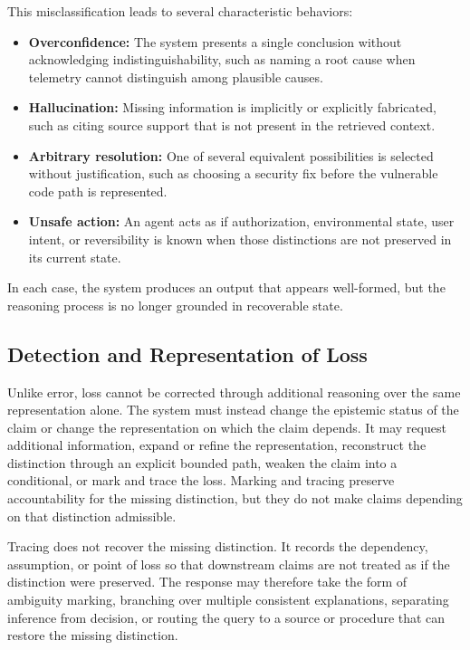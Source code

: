 \documentclass[11pt]{article}
\begin{document}
This misclassification leads to several characteristic behaviors:
\begin{itemize}[leftmargin=1.5em]
    \item \textbf{Overconfidence:} The system presents a single conclusion without acknowledging indistinguishability, such as naming a root cause when telemetry cannot distinguish among plausible causes.
    \item \textbf{Hallucination:} Missing information is implicitly or explicitly fabricated, such as citing source support that is not present in the retrieved context.
    \item \textbf{Arbitrary resolution:} One of several equivalent possibilities is selected without justification, such as choosing a security fix before the vulnerable code path is represented.
    \item \textbf{Unsafe action:} An agent acts as if authorization, environmental state, user intent, or reversibility is known when those distinctions are not preserved in its current state.
\end{itemize}

In each case, the system produces an output that appears well-formed, but the reasoning process is no longer grounded in recoverable state.

\subsection{Detection and Representation of Loss}

Unlike error, loss cannot be corrected through additional reasoning over the same representation alone. The system must instead change the epistemic status of the claim or change the representation on which the claim depends. It may request additional information, expand or refine the representation, reconstruct the distinction through an explicit bounded path, weaken the claim into a conditional, or mark and trace the loss. Marking and tracing preserve accountability for the missing distinction, but they do not make claims depending on that distinction admissible.

Tracing does not recover the missing distinction. It records the dependency, assumption, or point of loss so that downstream claims are not treated as if the distinction were preserved. The response may therefore take the form of ambiguity marking, branching over multiple consistent explanations, separating inference from decision, or routing the query to a source or procedure that can restore the missing distinction.
\end{document}
